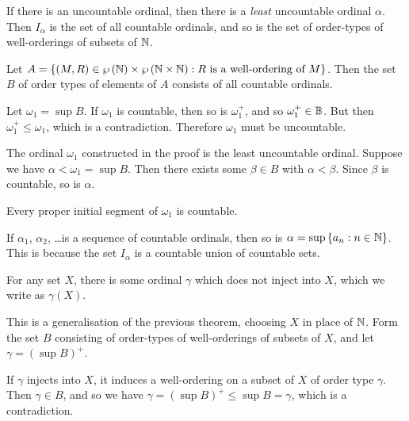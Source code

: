 \documentclass{article}
\begin{document}
\begin{prf}
    If there is an uncountable ordinal, then there is a \textit{least} uncountable ordinal $\alpha$. Then $I_\alpha$ is the set of all countable ordinals, and so is the set of order-types of well-orderings of subsets of $\mathbb{N}$.
    
    Let $A = \left\lbrace (M, R) \in \wp\left(\mathbb{N}\right) \times \wp\left(\mathbb{N} \times \mathbb{N}\right) : R \text{ is a well-ordering of } M \right\rbrace$. Then the set $B$ of order types of elements of $A$ consists of all countable ordinals.
    
    Let $\omega_1 = \sup B$. If $\omega_1$ is countable, then so is $\omega_1^+$, and so $\omega_1^+ \in \mathbb{B}$. But then $\omega_1^+ \leq \omega_1$, which is a contradiction. Therefore $\omega_1$ must be uncountable.
\end{prf}

\begin{corollary}
	The ordinal $\omega_1$ constructed in the proof is the least uncountable ordinal. Suppose we have $\alpha < \omega_1 = \sup B$. Then there exists some $\beta \in B$ with $\alpha < \beta$. Since $\beta$ is countable, so is $\alpha$.
\end{corollary}

\begin{corollary}
    Every proper initial segment of $\omega_1$ is countable.
\end{corollary}

\begin{corollary}
    If $\alpha_1$, $\alpha_2$, \dots is a sequence of countable ordinals, then so is $\alpha = \sup \left\lbrace a_n : n \in \mathbb{N} \right\rbrace$. This is because the set $I_\alpha$ is a countable union of countable sets.
\end{corollary}

\begin{theorem}
	\label{hartogs-lemma}
    For any set $X$, there is some ordinal $\gamma$ which does not inject into $X$, which we write as $\gamma(X)$.
\end{theorem}

\begin{prf}
    This is a generalisation of the previous theorem, choosing $X$ in place of $\mathbb{N}$. Form the set $B$ consisting of order-types of well-orderings of subsets of $X$, and let $\gamma = (\sup B)^+$.
    
    If $\gamma$ injects into $X$, it induces a well-ordering on a subset of $X$ of order type $\gamma$. Then $\gamma \in B$, and so we have $\gamma = (\sup B)^+ \leq \sup B = \gamma$, which is a contradiction.
\end{prf}
\end{document}
